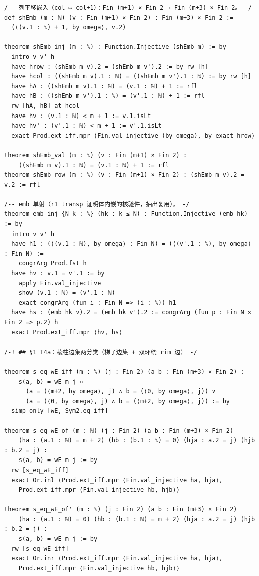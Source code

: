 \documentclass[11pt]{article}
\begin{document}
\begin{lstlisting}
/-- 列平移嵌入（col ↦ col+1）：Fin (m+1) × Fin 2 → Fin (m+3) × Fin 2。 -/
def shEmb (m : ℕ) (v : Fin (m+1) × Fin 2) : Fin (m+3) × Fin 2 :=
  (⟨(v.1 : ℕ) + 1, by omega⟩, v.2)

theorem shEmb_inj (m : ℕ) : Function.Injective (shEmb m) := by
  intro v v' h
  have hrow : (shEmb m v).2 = (shEmb m v').2 := by rw [h]
  have hcol : ((shEmb m v).1 : ℕ) = ((shEmb m v').1 : ℕ) := by rw [h]
  have hA : ((shEmb m v).1 : ℕ) = (v.1 : ℕ) + 1 := rfl
  have hB : ((shEmb m v').1 : ℕ) = (v'.1 : ℕ) + 1 := rfl
  rw [hA, hB] at hcol
  have hv : (v.1 : ℕ) < m + 1 := v.1.isLt
  have hv' : (v'.1 : ℕ) < m + 1 := v'.1.isLt
  exact Prod.ext_iff.mpr ⟨Fin.val_injective (by omega), by exact hrow⟩

theorem shEmb_val (m : ℕ) (v : Fin (m+1) × Fin 2) :
    ((shEmb m v).1 : ℕ) = (v.1 : ℕ) + 1 := rfl
theorem shEmb_row (m : ℕ) (v : Fin (m+1) × Fin 2) : (shEmb m v).2 = v.2 := rfl

/-- emb 单射（r1 transp 证明体内嵌的核验件，抽出复用）。 -/
theorem emb_inj {N k : ℕ} (hk : k ≤ N) : Function.Injective (emb hk) := by
  intro v v' h
  have h1 : (⟨(v.1 : ℕ), by omega⟩ : Fin N) = (⟨(v'.1 : ℕ), by omega⟩ : Fin N) :=
    congrArg Prod.fst h
  have hv : v.1 = v'.1 := by
    apply Fin.val_injective
    show (v.1 : ℕ) = (v'.1 : ℕ)
    exact congrArg (fun i : Fin N => (i : ℕ)) h1
  have hs : (emb hk v).2 = (emb hk v').2 := congrArg (fun p : Fin N × Fin 2 => p.2) h
  exact Prod.ext_iff.mpr ⟨hv, hs⟩

/-! ## §1 T4a：棱柱边集两分类（梯子边集 + 双环绕 rim 边） -/

theorem s_eq_wE_iff (m : ℕ) (j : Fin 2) (a b : Fin (m+3) × Fin 2) :
    s(a, b) = wE m j ↔
      (a = (⟨m+2, by omega⟩, j) ∧ b = (⟨0, by omega⟩, j)) ∨
      (a = (⟨0, by omega⟩, j) ∧ b = (⟨m+2, by omega⟩, j)) := by
  simp only [wE, Sym2.eq_iff]

theorem s_eq_wE_of (m : ℕ) (j : Fin 2) (a b : Fin (m+3) × Fin 2)
    (ha : (a.1 : ℕ) = m + 2) (hb : (b.1 : ℕ) = 0) (hja : a.2 = j) (hjb : b.2 = j) :
    s(a, b) = wE m j := by
  rw [s_eq_wE_iff]
  exact Or.inl ⟨Prod.ext_iff.mpr ⟨Fin.val_injective ha, hja⟩,
    Prod.ext_iff.mpr ⟨Fin.val_injective hb, hjb⟩⟩

theorem s_eq_wE_of' (m : ℕ) (j : Fin 2) (a b : Fin (m+3) × Fin 2)
    (ha : (a.1 : ℕ) = 0) (hb : (b.1 : ℕ) = m + 2) (hja : a.2 = j) (hjb : b.2 = j) :
    s(a, b) = wE m j := by
  rw [s_eq_wE_iff]
  exact Or.inr ⟨Prod.ext_iff.mpr ⟨Fin.val_injective ha, hja⟩,
    Prod.ext_iff.mpr ⟨Fin.val_injective hb, hjb⟩⟩


\end{lstlisting}
\end{document}
